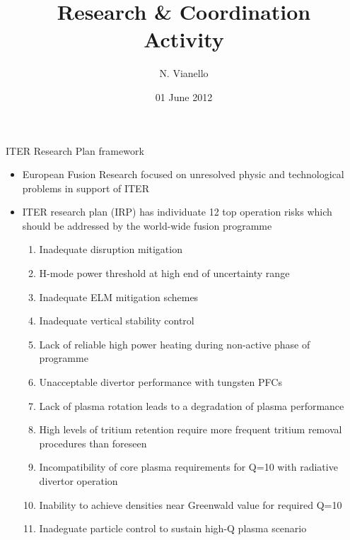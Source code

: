 \documentclass[t,10pt]{beamer}
\title{Research \& Coordination  \\
Activity}
\author{N. Vianello }
\date{01 June 2012}
\begin{document}
\begin{titleframe}
\end{titleframe}

\begin{frame}{ITER Research Plan framework}
\begin{itemize}
\item European Fusion Research focused on unresolved physic and
technological problems in support of ITER
\item ITER research plan (IRP) has individuate 12 top operation risks which 
should be addressed by the world-wide fusion programme
\begin{enumerate}
\item {} Inadequate disruption mitigation
\item {} H-mode power threshold at high end of
  uncertainty range
\item {} Inadequate ELM mitigation schemes
\item {} Inadequate vertical stability control
\item {}Lack of reliable high power heating during
  non-active phase of programme
\item {} Unacceptable divertor performance with tungsten PFCs
\item {} Lack of plasma rotation leads to a
  degradation of plasma performance
\item {} High levels of tritium retention require more
  frequent tritium removal procedures than foreseen
\item {} Incompatibility of core plasma requirements for Q=10 with
  radiative divertor operation
\item {}Inability to achieve densities near
  Greenwald value for required Q=10
\item {} Inadeguate particle control to sustain
  high-Q plasma scenario
\end{enumerate}
\end{itemize}

\end{frame}
\end{document}
